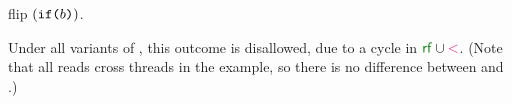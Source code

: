 flip $(\texttt{if}\,\allowbreak\!\texttt{(}b\texttt{)})$.

Under all variants of \PwT{}, this outcome is disallowed, due to a cycle in
${\rrfx}\cup{\lt}$. (Note that all reads cross threads in the example, so
there is no difference between  and .)


